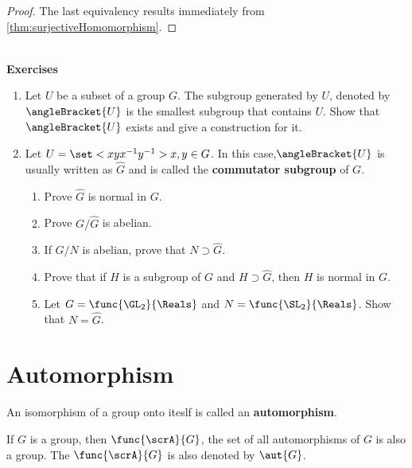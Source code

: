 \begin{proof}
    The last equivalency results immediately from \ref{thm:surjectiveHomomorphism}. 
\end{proof}
\ \\ 
{\Large{\textbf{Exercises}}}
\begin{enumerate}
    \item Let \(U\) be a subset of a group \(G\). The subgroup generated by \(U\), denoted by \(\angleBracket{U}\) is the smallest subgroup that contains \(U\). Show that \(\angleBracket{U}\) exists and give a construction for it.
    \item Let \(U = \set<xyx^{-1}y^{-1}>{x,y \in G}\). In this case,\(\angleBracket{U}\) is usually written as \(\hat{G}\) and is called the \textbf{commutator subgroup} of \(G\).
    \begin{enumerate}
        \item Prove \(\hat{G}\) is normal in \(G\).
        \item Prove \(G/\hat{G}\) is abelian.
        \item If \(G/N\) is abelian, prove that \(N \supset \hat{G}\).
        \item Prove that if \(H\) is a subgroup of \(G\) and \(H \supset \hat{G}\), then \(H\) is normal in \(G\).
        \item Let \(G = \func{\GL_2}{\Reals}\) and \(N = \func{\SL_2}{\Reals}\). Show that \(N = \hat{G}\).
    \end{enumerate}
\end{enumerate}

\section{Automorphism}
\begin{definition}
    An isomorphism of a group onto iteslf is called an \textbf{automorphism}.
\end{definition}

\begin{lemma}
    If \(G\) is a group, then \(\func{\scrA}{G}\), the set of all automorphisms of \(G\) is also a group. The \(\func{\scrA}{G}\) is also denoted by \(\aut{G}\).
\end{lemma}

